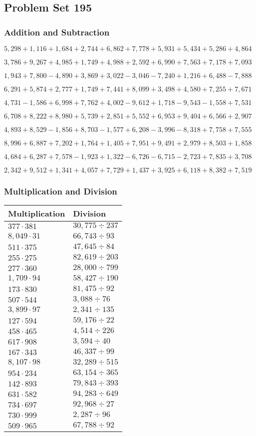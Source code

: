\hypertarget{problem-set-195}{%
\subsection{Problem Set 195}\label{problem-set-195}}

\hypertarget{addition-and-subtraction}{%
\subsubsection{Addition and
Subtraction}\label{addition-and-subtraction}}

\(5,298+1,116+1,684+2,744+6,862+7,778+5,931+5,434+5,286+4,864\)

\(3,786+9,267+4,985+1,749+4,988+2,592+6,990+7,563+7,178+7,093\)

\(1,943+7,800-4,890+3,869+3,022-3,046-7,240+1,216+6,488-7,888\)

\(6,291+5,874+2,777+1,749+7,441+8,099+3,498+4,580+7,255+7,671\)

\(4,731-1,586+6,998+7,762+4,002-9,612+1,718-9,543-1,558+7,531\)

\(6,708+8,222+8,980+5,739+2,851+5,552+6,953+9,404+6,566+2,907\)

\(4,893+8,529-1,856+8,703-1,577+6,208-3,996-8,318+7,758+7,555\)

\(8,996+6,887+7,202+1,764+1,405+7,951+9,491+2,979+8,503+1,858\)

\(4,684+6,287+7,578-1,923+1,322-6,726-6,715-2,723+7,835+3,708\)

\(2,342+9,512+1,341+4,057+7,729+1,437+3,925+6,118+8,382+7,519\)

\hypertarget{multiplication-and-division}{%
\subsubsection{Multiplication and
Division}\label{multiplication-and-division}}

\begin{longtable}[]{@{}ll@{}}
\toprule
Multiplication & Division\tabularnewline
\midrule
\endhead
\(377\cdot381\) & \(30,775÷237\)\tabularnewline
\(8,049\cdot31\) & \(66,743÷93\)\tabularnewline
\(511\cdot375\) & \(47,645÷84\)\tabularnewline
\(255\cdot275\) & \(82,619÷203\)\tabularnewline
\(277\cdot360\) & \(28,000÷799\)\tabularnewline
\(1,709\cdot94\) & \(58,427÷190\)\tabularnewline
\(173\cdot830\) & \(81,475÷92\)\tabularnewline
\(507\cdot544\) & \(3,088÷76\)\tabularnewline
\(3,899\cdot97\) & \(2,341÷135\)\tabularnewline
\(127\cdot594\) & \(59,176÷22\)\tabularnewline
\(458\cdot465\) & \(4,514÷226\)\tabularnewline
\(617\cdot908\) & \(3,594÷40\)\tabularnewline
\(167\cdot343\) & \(46,337÷99\)\tabularnewline
\(8,107\cdot98\) & \(32,289÷515\)\tabularnewline
\(954\cdot234\) & \(63,154÷365\)\tabularnewline
\(142\cdot893\) & \(79,843÷393\)\tabularnewline
\(631\cdot582\) & \(94,283÷649\)\tabularnewline
\(734\cdot697\) & \(92,968÷27\)\tabularnewline
\(730\cdot999\) & \(2,287÷96\)\tabularnewline
\(509\cdot965\) & \(67,788÷92\)\tabularnewline
\bottomrule
\end{longtable}
